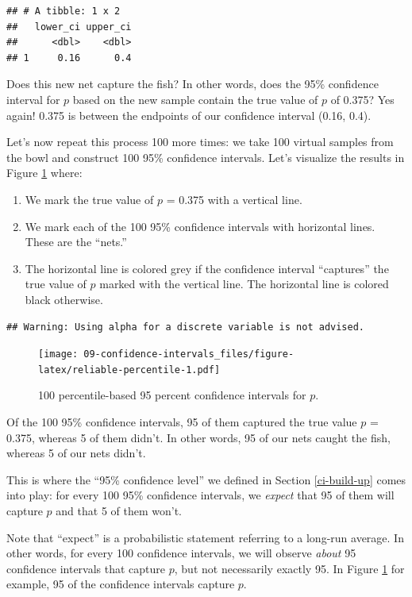 \documentclass[
]{book}
\providecommand{\tightlist}{%
  \setlength{\itemsep}{0pt}\setlength{\parskip}{0pt}}
\begin{document}
\begin{verbatim}
## # A tibble: 1 x 2
##   lower_ci upper_ci
##      <dbl>    <dbl>
## 1     0.16      0.4
\end{verbatim}

Does this new net capture the fish? In other words, does the 95\% confidence interval for \(p\) based on the new sample contain the true value of \(p\) of 0.375? Yes again! 0.375 is between the endpoints of our confidence interval (0.16, 0.4).

Let's now repeat this process 100 more times: we take 100 virtual samples from the bowl and construct 100 95\% confidence intervals. Let's visualize the results in Figure \ref{fig:reliable-percentile} where:

\begin{enumerate}
\def\labelenumi{\arabic{enumi}.}
\tightlist
\item
  We mark the true value of \(p\) = 0.375 with a vertical line.
\item
  We mark each of the 100 95\% confidence intervals with horizontal lines. These are the ``nets.''
\item
  The horizontal line is colored grey if the confidence interval ``captures'' the true value of \(p\) marked with the vertical line. The horizontal line is colored black otherwise.
\end{enumerate}

\begin{verbatim}
## Warning: Using alpha for a discrete variable is not advised.
\end{verbatim}

\begin{figure}
\centering
\texttt{[image: 09-confidence-intervals\_files/figure-latex/reliable-percentile-1.pdf]}
\caption{\label{fig:reliable-percentile}100 percentile-based 95 percent confidence intervals for \(p\).}
\end{figure}

Of the 100 95\% confidence intervals, 95 of them captured the true value \(p\) = 0.375, whereas 5 of them didn't. In other words, 95 of our nets caught the fish, whereas 5 of our nets didn't.

This is where the ``95\% confidence level'' we defined in Section \ref{ci-build-up} comes into play: for every 100 95\% confidence intervals, we \emph{expect} that 95 of them will capture \(p\) and that 5 of them won't.

Note that ``expect'' is a probabilistic statement referring to a long-run average. In other words, for every 100 confidence intervals, we will observe \emph{about} 95 confidence intervals that capture \(p\), but not necessarily exactly 95. In Figure \ref{fig:reliable-percentile} for example, 95 of the confidence intervals capture \(p\).
\end{document}
